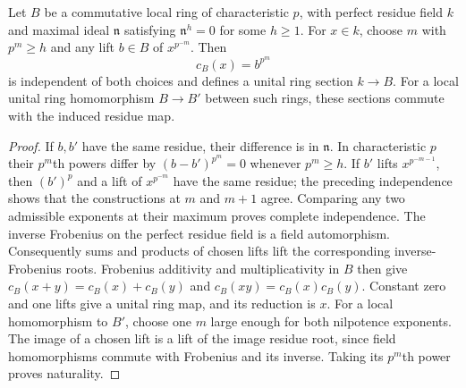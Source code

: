 \begin{lemma}
\label{fw:perfect-truncated-coefficients}
\leanok
Let $B$ be a commutative local ring of characteristic $p$, with perfect residue
field $k$ and maximal ideal $\mathfrak n$ satisfying
$\mathfrak n^h=0$ for some $h\geq1$.
For $x\in k$, choose $m$ with $p^m\geq h$ and any lift $b\in B$
of $x^{p^{-m}}$. Then
\[
 c_B(x)=b^{p^m}
\]
is independent of both choices and defines a unital ring section
$k\to B$. For a local unital ring homomorphism $B\to B'$ between
such rings, these sections commute with the induced residue map.
\end{lemma}
\begin{proof}
If $b,b'$ have the same residue, their difference is in $\mathfrak n$.
In characteristic $p$ their $p^m$th powers differ by
$(b-b')^{p^m}=0$ whenever $p^m\geq h$.
If $b'$ lifts $x^{p^{-m-1}}$, then $(b')^p$ and a lift of
$x^{p^{-m}}$ have the same residue; the preceding independence shows
that the constructions at $m$ and $m+1$ agree. Comparing any two
admissible exponents at their maximum proves complete independence.
The inverse Frobenius on the perfect residue field is a field
automorphism. Consequently sums and products of chosen lifts lift
the corresponding inverse-Frobenius roots. Frobenius additivity and
multiplicativity in $B$ then give
$c_B(x+y)=c_B(x)+c_B(y)$ and $c_B(xy)=c_B(x)c_B(y)$.
Constant zero and one lifts give a unital ring map, and its reduction
is $x$. For a local homomorphism to $B'$, choose one $m$ large enough
for both nilpotence exponents. The image of a chosen lift is a lift
of the image residue root, since field homomorphisms commute with
Frobenius and its inverse. Taking its $p^m$th power proves naturality.
\end{proof}

